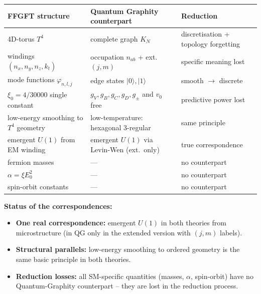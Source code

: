 \begin{center}
\renewcommand{\arraystretch}{1.4}
{\small
\begin{tabular}{>{\raggedright\arraybackslash}p{3.1cm}>{\raggedright\arraybackslash}p{3.7cm}>{\raggedright\arraybackslash}p{3.3cm}}
\toprule
\textbf{FFGFT structure} & \textbf{Quantum Graphity counterpart} & \textbf{Reduction} \\
\midrule
4D-torus $T^4$ & complete graph $K_N$ & discretisation + topology forgetting \\[3pt]
windings $(n_x, n_y, n_z, k_t)$ & occupation $n_{ab}$ + ext.\ $(j, m)$ & specific meaning lost \\[3pt]
mode functions $\varphi_{n,l,j}$ & edge states $|0\rangle, |1\rangle$ & smooth $\to$ discrete \\[3pt]
$\xi_0 = 4/30000$ single constant & $g_V, g_B, g_C, g_D, g_\pm$ and $v_0$ free & predictive power lost \\[3pt]
low-energy smoothing to $T^4$ geometry & low-temperature: hexagonal $3$-regular & same principle \\[3pt]
emergent $U(1)$ from EM winding & emergent $U(1)$ via Levin-Wen (ext.\ only) & true correspondence \\[3pt]
12 fermion masses & --- & no counterpart \\[3pt]
$\alpha = \xi E_0^2$ & --- & no counterpart \\[3pt]
spin-orbit constants & --- & no counterpart \\
\bottomrule
\end{tabular}
}
\renewcommand{\arraystretch}{1.0}
\end{center}

\textbf{Status of the correspondences:}
\begin{itemize}[leftmargin=2em,itemsep=2pt,topsep=2pt]
  \item \textbf{One real correspondence:} emergent $U(1)$ in both
        theories from microstructure (in QG only in the extended
        version with $(j, m)$ labels).
  \item \textbf{Structural parallels:} low-energy smoothing to
        ordered geometry is the same basic principle in both
        theories.
  \item \textbf{Reduction losses:} all SM-specific quantities
        (masses, $\alpha$, spin-orbit) have no Quantum-Graphity
        counterpart -- they are lost in the reduction process.
\end{itemize}

